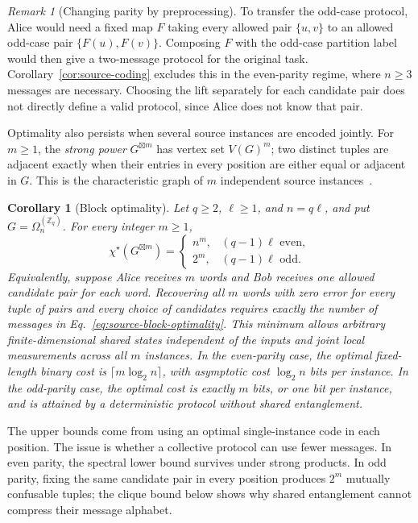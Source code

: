 \documentclass[11pt,a4paper]{article}
\numberwithin{equation}{section}
\numberwithin{figure}{section}
\numberwithin{table}{section}
\numberwithin{footnote}{section}
\newtheorem{corollary}[theorem]{Corollary}
\theoremstyle{informal}\newtheorem*{informaltheorem}{Informal theorem}
\theoremstyle{definition}\newtheorem{example}{Example}[section]
\theoremstyle{remark}\newtheorem{remark}[theorem]{Remark}
\newcommand{\Z}{\mathbb Z}
\newcommand{\chs}{\chi^{\star}}
\newcommand{\Om}{\Omega_n^{(\Z_q)}}
\begin{document}
\begin{remark}[Changing parity by preprocessing]\label{rem:parity-preprocessing}
To transfer the odd-case protocol, Alice would need a fixed map
\(F\) taking every allowed pair \(\{u,v\}\) to an allowed
odd-case pair \(\{F(u),F(v)\}\). Composing \(F\) with the
odd-case partition label would then give a two-message protocol
for the original task. Corollary~\ref{cor:source-coding} excludes
this in the even-parity regime, where \(n\geq3\) messages are
necessary. Choosing the lift separately for each candidate pair
does not directly define a valid protocol, since Alice does not
know that pair.
\end{remark}

Optimality also persists when several source instances are encoded
jointly. For \(m\geq1\), the \emph{strong power}
\(G^{\boxtimes m}\) has vertex set \(V(G)^m\); two distinct tuples
are adjacent exactly when their entries in every position are either
equal or adjacent in \(G\). This is the characteristic graph of
\(m\) independent source instances~\cite[Secs.~1.1--1.2]{bblps}.

\begin{corollary}[Block optimality]\label{cor:source-block-coding}
Let \(q\geq2\), \(\ell\geq1\), and \(n=q\ell\), and put
\(G=\Om\). For every integer \(m\geq1\),
\begin{equation}\label{eq:source-block-optimality}
 \chs\!\left(G^{\boxtimes m}\right)=
 \begin{cases}
 n^m,&(q-1)\ell\text{ even},\\
 2^m,&(q-1)\ell\text{ odd}.
 \end{cases}
\end{equation}
Equivalently, suppose Alice receives \(m\) words and Bob receives
one allowed candidate pair for each word. Recovering all \(m\) words
with zero error for every tuple of pairs and every choice of candidates
requires exactly the number of messages in
Eq.~\eqref{eq:source-block-optimality}. This minimum allows arbitrary
finite-dimensional shared states independent of the inputs and joint
local measurements across all \(m\) instances.
In the even-parity case, the optimal fixed-length binary cost is
\(\lceil m\log_2 n\rceil\), with asymptotic cost
\(\log_2 n\) bits per instance. In the odd-parity case, the optimal
cost is exactly \(m\) bits, or one bit per instance, and is attained
by a deterministic protocol without shared entanglement.
\end{corollary}

The upper bounds come from using an optimal single-instance code in
each position. The issue is whether a collective protocol can use fewer
messages. In even parity, the spectral lower bound survives under
strong products. In odd parity, fixing the same candidate pair in
every position produces \(2^m\) mutually confusable tuples; the clique
bound below shows why shared entanglement cannot compress their message
alphabet.
\end{document}

